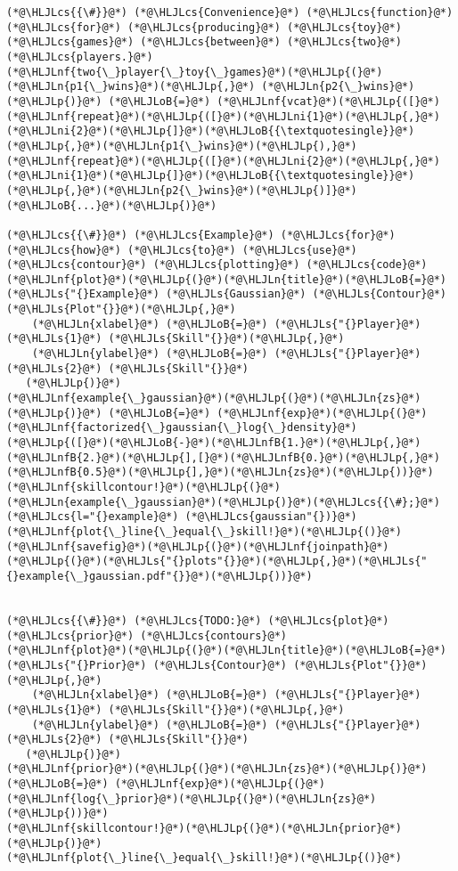 \documentclass[12pt,a4paper]{article}
\newcommand{\HLJLn}[1]{#1}
\newcommand{\HLJLnf}[1]{\textcolor[RGB]{66,102,213}{#1}}
\newcommand{\HLJLs}[1]{\textcolor[RGB]{201,61,57}{#1}}
\newcommand{\HLJLnfB}[1]{\textcolor[RGB]{59,151,46}{#1}}
\newcommand{\HLJLni}[1]{\textcolor[RGB]{59,151,46}{#1}}
\newcommand{\HLJLoB}[1]{\textcolor[RGB]{102,102,102}{\textbf{#1}}}
\newcommand{\HLJLp}[1]{#1}
\newcommand{\HLJLcs}[1]{\textcolor[RGB]{153,153,119}{\textit{#1}}}
\begin{document}
\begin{lstlisting}
(*@\HLJLcs{{\#}}@*) (*@\HLJLcs{Convenience}@*) (*@\HLJLcs{function}@*) (*@\HLJLcs{for}@*) (*@\HLJLcs{producing}@*) (*@\HLJLcs{toy}@*) (*@\HLJLcs{games}@*) (*@\HLJLcs{between}@*) (*@\HLJLcs{two}@*) (*@\HLJLcs{players.}@*)
(*@\HLJLnf{two{\_}player{\_}toy{\_}games}@*)(*@\HLJLp{(}@*)(*@\HLJLn{p1{\_}wins}@*)(*@\HLJLp{,}@*) (*@\HLJLn{p2{\_}wins}@*)(*@\HLJLp{)}@*) (*@\HLJLoB{=}@*) (*@\HLJLnf{vcat}@*)(*@\HLJLp{([}@*)(*@\HLJLnf{repeat}@*)(*@\HLJLp{([}@*)(*@\HLJLni{1}@*)(*@\HLJLp{,}@*)(*@\HLJLni{2}@*)(*@\HLJLp{]}@*)(*@\HLJLoB{{\textquotesingle}}@*)(*@\HLJLp{,}@*)(*@\HLJLn{p1{\_}wins}@*)(*@\HLJLp{),}@*) (*@\HLJLnf{repeat}@*)(*@\HLJLp{([}@*)(*@\HLJLni{2}@*)(*@\HLJLp{,}@*)(*@\HLJLni{1}@*)(*@\HLJLp{]}@*)(*@\HLJLoB{{\textquotesingle}}@*)(*@\HLJLp{,}@*)(*@\HLJLn{p2{\_}wins}@*)(*@\HLJLp{)]}@*)(*@\HLJLoB{...}@*)(*@\HLJLp{)}@*)

(*@\HLJLcs{{\#}}@*) (*@\HLJLcs{Example}@*) (*@\HLJLcs{for}@*) (*@\HLJLcs{how}@*) (*@\HLJLcs{to}@*) (*@\HLJLcs{use}@*) (*@\HLJLcs{contour}@*) (*@\HLJLcs{plotting}@*) (*@\HLJLcs{code}@*)
(*@\HLJLnf{plot}@*)(*@\HLJLp{(}@*)(*@\HLJLn{title}@*)(*@\HLJLoB{=}@*)(*@\HLJLs{"{}Example}@*) (*@\HLJLs{Gaussian}@*) (*@\HLJLs{Contour}@*) (*@\HLJLs{Plot"{}}@*)(*@\HLJLp{,}@*)
    (*@\HLJLn{xlabel}@*) (*@\HLJLoB{=}@*) (*@\HLJLs{"{}Player}@*) (*@\HLJLs{1}@*) (*@\HLJLs{Skill"{}}@*)(*@\HLJLp{,}@*)
    (*@\HLJLn{ylabel}@*) (*@\HLJLoB{=}@*) (*@\HLJLs{"{}Player}@*) (*@\HLJLs{2}@*) (*@\HLJLs{Skill"{}}@*)
   (*@\HLJLp{)}@*)
(*@\HLJLnf{example{\_}gaussian}@*)(*@\HLJLp{(}@*)(*@\HLJLn{zs}@*)(*@\HLJLp{)}@*) (*@\HLJLoB{=}@*) (*@\HLJLnf{exp}@*)(*@\HLJLp{(}@*)(*@\HLJLnf{factorized{\_}gaussian{\_}log{\_}density}@*)(*@\HLJLp{([}@*)(*@\HLJLoB{-}@*)(*@\HLJLnfB{1.}@*)(*@\HLJLp{,}@*)(*@\HLJLnfB{2.}@*)(*@\HLJLp{],[}@*)(*@\HLJLnfB{0.}@*)(*@\HLJLp{,}@*)(*@\HLJLnfB{0.5}@*)(*@\HLJLp{],}@*)(*@\HLJLn{zs}@*)(*@\HLJLp{))}@*)
(*@\HLJLnf{skillcontour!}@*)(*@\HLJLp{(}@*)(*@\HLJLn{example{\_}gaussian}@*)(*@\HLJLp{)}@*)(*@\HLJLcs{{\#};}@*) (*@\HLJLcs{l="{}example}@*) (*@\HLJLcs{gaussian"{})}@*)
(*@\HLJLnf{plot{\_}line{\_}equal{\_}skill!}@*)(*@\HLJLp{()}@*)
(*@\HLJLnf{savefig}@*)(*@\HLJLp{(}@*)(*@\HLJLnf{joinpath}@*)(*@\HLJLp{(}@*)(*@\HLJLs{"{}plots"{}}@*)(*@\HLJLp{,}@*)(*@\HLJLs{"{}example{\_}gaussian.pdf"{}}@*)(*@\HLJLp{))}@*)


(*@\HLJLcs{{\#}}@*) (*@\HLJLcs{TODO:}@*) (*@\HLJLcs{plot}@*) (*@\HLJLcs{prior}@*) (*@\HLJLcs{contours}@*)
(*@\HLJLnf{plot}@*)(*@\HLJLp{(}@*)(*@\HLJLn{title}@*)(*@\HLJLoB{=}@*)(*@\HLJLs{"{}Prior}@*) (*@\HLJLs{Contour}@*) (*@\HLJLs{Plot"{}}@*)(*@\HLJLp{,}@*)
    (*@\HLJLn{xlabel}@*) (*@\HLJLoB{=}@*) (*@\HLJLs{"{}Player}@*) (*@\HLJLs{1}@*) (*@\HLJLs{Skill"{}}@*)(*@\HLJLp{,}@*)
    (*@\HLJLn{ylabel}@*) (*@\HLJLoB{=}@*) (*@\HLJLs{"{}Player}@*) (*@\HLJLs{2}@*) (*@\HLJLs{Skill"{}}@*)
   (*@\HLJLp{)}@*)
(*@\HLJLnf{prior}@*)(*@\HLJLp{(}@*)(*@\HLJLn{zs}@*)(*@\HLJLp{)}@*) (*@\HLJLoB{=}@*) (*@\HLJLnf{exp}@*)(*@\HLJLp{(}@*)(*@\HLJLnf{log{\_}prior}@*)(*@\HLJLp{(}@*)(*@\HLJLn{zs}@*)(*@\HLJLp{))}@*)
(*@\HLJLnf{skillcontour!}@*)(*@\HLJLp{(}@*)(*@\HLJLn{prior}@*)(*@\HLJLp{)}@*)
(*@\HLJLnf{plot{\_}line{\_}equal{\_}skill!}@*)(*@\HLJLp{()}@*)
\end{lstlisting}
\end{document}
